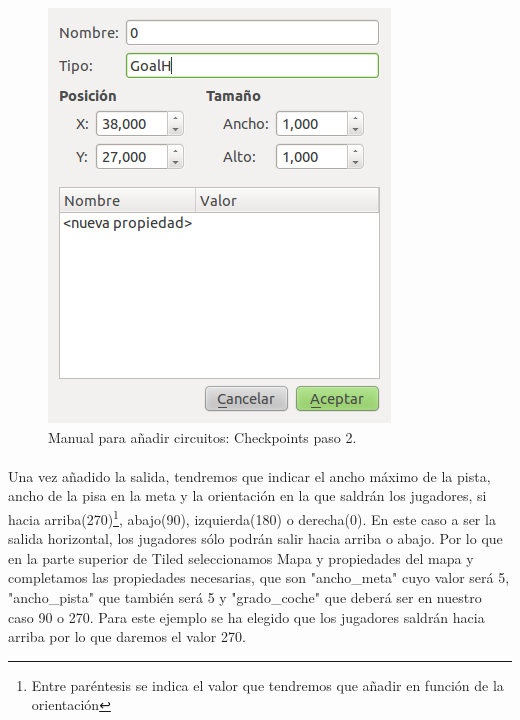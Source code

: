 \begin{figure}[H]
  \label{checkpoints2}
  \begin{center}
    \includegraphics[scale=0.5]{imagenes/manualcircuito/checkpoints2.png}
  \end{center}
  \caption{Manual para añadir circuitos: Checkpoints paso 2.}
\end{figure}

\paragraph{}
Una vez añadido la salida, tendremos que indicar el ancho máximo de la pista, ancho de la pisa en la meta y la orientación en la 
que saldrán los jugadores, si hacia arriba(270)\footnote{Entre paréntesis se indica el valor que tendremos que añadir en función 
de la orientación}, abajo(90), izquierda(180) o derecha(0). En este caso a ser la salida horizontal, 
los jugadores sólo podrán salir hacia arriba o abajo. Por lo que en la parte superior de Tiled seleccionamos Mapa y propiedades 
del mapa y completamos las propiedades necesarias, que son "ancho\_meta" cuyo valor será 5, "ancho\_pista" que también será 5 y 
"grado\_coche" que deberá ser en nuestro caso 90 o 270. Para este ejemplo se ha elegido que los jugadores saldrán hacia arriba por lo
que daremos el valor 270.


